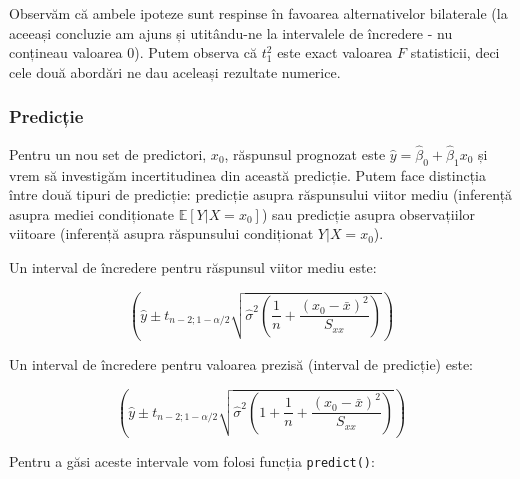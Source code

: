 \documentclass[]{article}
\begin{document}
Observăm că ambele ipoteze sunt respinse în favoarea alternativelor
bilaterale (la aceeași concluzie am ajuns și utitându-ne la intervalele
de încredere - nu conțineau valoarea \(0\)). Putem observa că \(t_1^2\)
este exact valoarea \(F\) statisticii, deci cele două abordări ne dau
aceleași rezultate numerice.

\subsubsection{Predicție}\label{predictie}

Pentru un nou set de predictori, \(x_0\), răspunsul prognozat este
\(\hat{y} = \hat{\beta}_0+\hat{\beta}_1 x_0\) și vrem să investigăm
incertitudinea din această predicție. Putem face distincția între două
tipuri de predicție: predicție asupra răspunsului viitor mediu
(inferență asupra mediei condiționate \(\mathbb{E}[Y|X=x_0]\)) sau
predicție asupra observațiilor viitoare (inferență asupra răspunsului
condiționat \(Y|X=x_0\)).

Un interval de încredere pentru răspunsul viitor mediu este:

\[
\left(\hat y \pm t_{n-2;1-\alpha/2}\sqrt{\hat\sigma^2\left(\frac{1}{n}+\frac{(x_0-\bar x)^2}{S_{xx}}\right)}\right)
\]

Un interval de încredere pentru valoarea prezisă (interval de predicție)
este:

\[
\left(\hat y \pm t_{n-2;1-\alpha/2}\sqrt{\hat\sigma^2\left(1+\frac{1}{n}+\frac{(x_0-\bar x)^2}{S_{xx}}\right)}\right)
\]

Pentru a găsi aceste intervale vom folosi funcția \texttt{predict()}:
\end{document}
